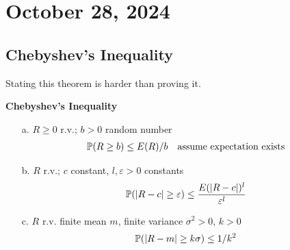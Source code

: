 \section{October 28, 2024}

\subsection{Chebyshev's Inequality}
Stating this theorem is harder than proving it.
\begin{theorem}
    \textbf{Chebyshev's Inequality}
    \begin{enumerate}
        \item[a.] $R \ge 0$ r.v.; $b > 0$ random number
        \begin{align}
            \mathbb{P}(R \ge b) \le E(R)/b && \text{assume expectation exists}
        \end{align}
        \item[b.] $R$ r.v.; $c$ constant, $l, \varepsilon > 0$ constants
        \begin{align}
            \mathbb{P}(\abs{R - c} \ge \varepsilon) \le \frac{E(\abs{R-c})^l}{\varepsilon^l}
        \end{align}
        \item[c.] $R$ r.v. finite mean $m$, finite variance $\sigma^2 > 0$, $k > 0$
        \begin{align}
            \mathbb{P}(\abs{R-m} \ge k\sigma) \le 1/k^2
        \end{align}
    \end{enumerate}
\end{theorem}

